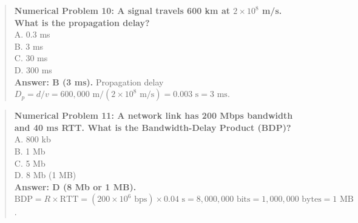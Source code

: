\begin{quote}
\textbf{Numerical Problem 10: A signal travels 600 km at $2 \times 10^8$ m/s. What is the propagation delay?}\\[4pt]
\quad A. 0.3 ms\\[2pt]
\quad B. 3 ms\\[2pt]
\quad C. 30 ms\\[2pt]
\quad D. 300 ms\\[2pt]
\vspace{4pt}
\textbf{Answer: B (3 ms).} Propagation delay $D_p = d / v = 600,000\text{ m} / (2 \times 10^8\text{ m/s}) = 0.003\text{ s} = 3\text{ ms}$.
\end{quote}

\begin{quote}
\textbf{Numerical Problem 11: A network link has 200 Mbps bandwidth and 40 ms RTT. What is the Bandwidth-Delay Product (BDP)?}\\[4pt]
\quad A. 800 kb\\[2pt]
\quad B. 1 Mb\\[2pt]
\quad C. 5 Mb\\[2pt]
\quad D. 8 Mb (1 MB)\\[2pt]
\vspace{4pt}
\textbf{Answer: D (8 Mb or 1 MB).} $\text{BDP} = R \times \text{RTT} = (200 \times 10^6\text{ bps}) \times 0.04\text{ s} = 8,000,000\text{ bits} = 1,000,000\text{ bytes} = 1\text{ MB}$.
\end{quote}

